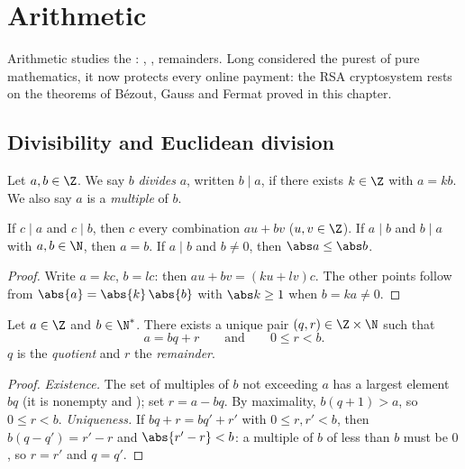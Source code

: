 \chapter{Arithmetic}\label{ch:g12:arith}

Arithmetic studies the : , , remainders.
Long considered the purest of pure mathematics, it now protects every online
payment: the RSA cryptosystem rests on the theorems of Bézout, Gauss and
Fermat proved in this chapter.

\section{Divisibility and Euclidean division}

\begin{definition}[Divisibility]\label{def:g12:arith:divides}
Let $a, b \in \Z$. We say $b$ \emph{divides} $a$, written
$b \mid a$, if there exists $k \in \Z$ with $a = kb$. We also say $a$ is a
\emph{multiple} of $b$.
\end{definition}

\begin{proposition}\label{prop:g12:arith:divprops}
If $c \mid a$ and $c \mid b$, then $c$  every  combination
$au + bv$ ($u, v \in \Z$). If $a \mid b$ and $b \mid a$ with
$a,b \in \N$, then $a = b$. If $a \mid b$ and $b \neq 0$, then $\abs a \leq \abs b$.
\end{proposition}

\begin{proof}
Write $a = kc$, $b = lc$: then $au + bv = (ku + lv)c$. The other points
follow from $\abs{a} = \abs{k}\,\abs{b}$ with $\abs k \geq 1$ when
$b = ka \neq 0$.
\end{proof}

\begin{theorem}\label{thm:g12:arith:euclid}
Let $a \in \Z$ and $b \in \N^*$. There exists a unique pair
$(q, r) \in \Z \times \N$ such that
\[
a = bq + r \qquad\text{and}\qquad 0 \leq r < b .
\]
$q$ is the \emph{quotient} and $r$ the \emph{remainder}.
\end{theorem}

\begin{proof}
\emph{Existence.} The set of multiples of $b$ not exceeding $a$ has a
largest element $bq$ (it is nonempty and ); set $r = a - bq$.
By maximality, $b(q+1) > a$, so $0 \leq r < b$.
\emph{Uniqueness.} If $bq + r = bq' + r'$ with $0 \leq r, r' < b$, then
$b(q - q') = r' - r$ and $\abs{r' - r} < b$: a multiple of $b$ of  less than $b$ must be $0$, so $r = r'$ and $q = q'$.
\end{proof}

